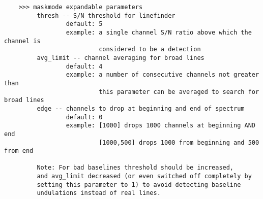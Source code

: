 \begin{verbatim}
    >>> maskmode expandable parameters
         thresh -- S/N threshold for linefinder
                 default: 5
                 example: a single channel S/N ratio above which the channel is
                          considered to be a detection
         avg_limit -- channel averaging for broad lines
                 default: 4
                 example: a number of consecutive channels not greater than
                          this parameter can be averaged to search for broad lines
         edge -- channels to drop at beginning and end of spectrum
                 default: 0
                 example: [1000] drops 1000 channels at beginning AND end
                          [1000,500] drops 1000 from beginning and 500 from end

         Note: For bad baselines threshold should be increased,
         and avg_limit decreased (or even switched off completely by
         setting this parameter to 1) to avoid detecting baseline
         undulations instead of real lines.


\end{verbatim}

